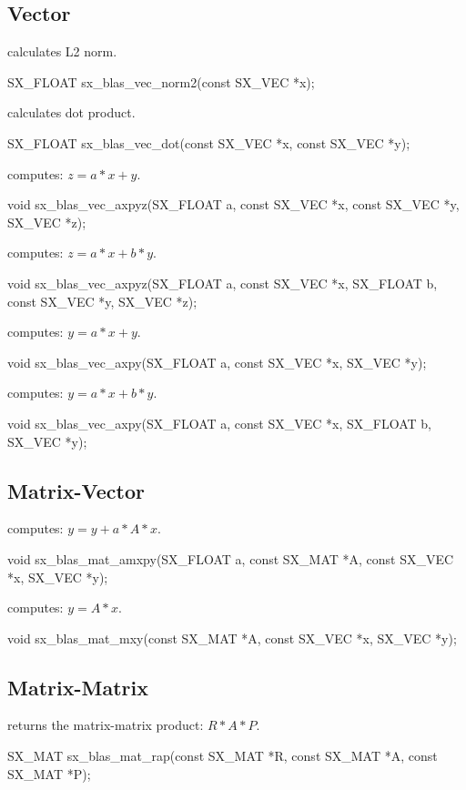 \subsection{Vector}
 calculates L2 norm.
\begin{evb}
SX_FLOAT sx_blas_vec_norm2(const SX_VEC *x);
\end{evb}

 calculates dot product.
\begin{evb}
SX_FLOAT sx_blas_vec_dot(const SX_VEC *x, const SX_VEC *y);
\end{evb}

 computes: $z = a * x + y$.
\begin{evb}
void sx_blas_vec_axpyz(SX_FLOAT a, const SX_VEC *x, const SX_VEC *y, SX_VEC *z);
\end{evb}

 computes: $z = a * x + b * y$.
\begin{evb}
void sx_blas_vec_axpyz(SX_FLOAT a, const SX_VEC *x, SX_FLOAT b, const SX_VEC *y, SX_VEC *z);
\end{evb}

 computes: $y = a * x + y$.
\begin{evb}
void sx_blas_vec_axpy(SX_FLOAT a, const SX_VEC *x, SX_VEC *y);
\end{evb}

 computes: $y = a * x + b * y$.
\begin{evb}
void sx_blas_vec_axpy(SX_FLOAT a, const SX_VEC *x, SX_FLOAT b, SX_VEC *y);
\end{evb}

\subsection{Matrix-Vector}
 computes: $ y = y + a * A * x $.
\begin{evb}
void sx_blas_mat_amxpy(SX_FLOAT a, const SX_MAT *A, const SX_VEC *x, SX_VEC *y);
\end{evb}

 computes: $y = A * x $.
\begin{evb}
void sx_blas_mat_mxy(const SX_MAT *A, const SX_VEC *x, SX_VEC *y);
\end{evb}

\subsection{Matrix-Matrix}
 returns the matrix-matrix product: $ R * A * P$.
\begin{evb}
SX_MAT sx_blas_mat_rap(const SX_MAT *R, const SX_MAT *A, const SX_MAT *P);
\end{evb}

